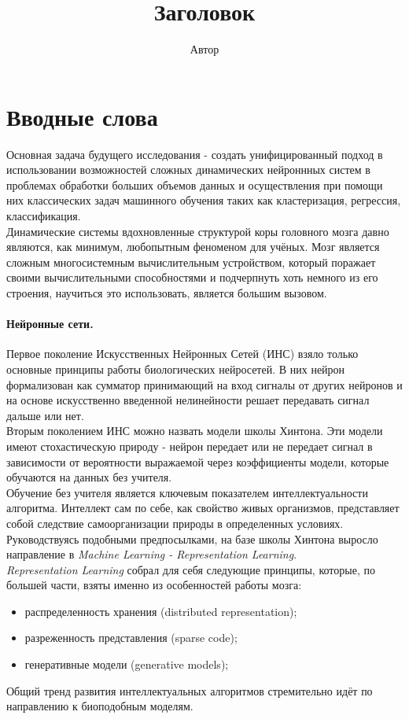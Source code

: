\documentclass[a4paper,10pt]{article}
\title{Заголовок}
\author{Автор}
\begin{document}
\setlength{\parindent}{10pt}
\section*{Вводные слова}
Основная задача будущего исследования - создать унифицированный подход в использовании возможностей сложных динамических нейроннных систем в проблемах обработки больших объемов данных и осуществления при помощи них классических задач машинного обучения таких как кластеризация, регрессия, классификация.\\
\indent Динамические системы вдохновленные структурой коры головного мозга давно являются, как минимум, любопытным феноменом для учёных. Мозг является сложным многосистемным вычислительным устройством, который поражает своими вычислительными способностями и подчерпнуть хоть немного из его строения, научиться это использовать, является большим вызовом.
\paragraph*{Нейронные сети.} Первое поколение Искусственных Нейронных Сетей (ИНС) взяло только основные принципы работы биологических нейросетей. В них нейрон формализован как сумматор принимающий на вход сигналы от других нейронов и на основе искусственно введенной нелинейности решает передавать сигнал дальше или нет.\\
\indent Вторым поколением ИНС можно назвать модели школы Хинтона\cite{hinton2006}. Эти модели имеют стохастическую природу - нейрон передает или не передает сигнал в зависимости от вероятности выражаемой через коэффициенты модели, которые обучаются на данных без учителя.\\ 
\indent Обучение без учителя является ключевым показателем интеллектуальности алгоритма. Интеллект сам по себе, как свойство живых организмов, представляет собой следствие самоорганизации природы в определенных условиях\cite{evolut}. Руководствуясь подобными предпосылками, на базе школы Хинтона выросло направление в \textit{Machine Learning - Representation Learning}\cite{yoshua}.\\
\indent \textit{Representation Learning} собрал для себя следующие принципы, которые, по большей части, взяты именно из особенностей работы мозга: 
\begin{itemize}
\item распределенность хранения (distributed representation);
\item разреженность представления (sparse code);
\item генеративные модели (generative models);
\end{itemize}
Общий тренд развития интеллектуальных алгоритмов стремительно идёт по направлению к биоподобным моделям.
\end{document}
